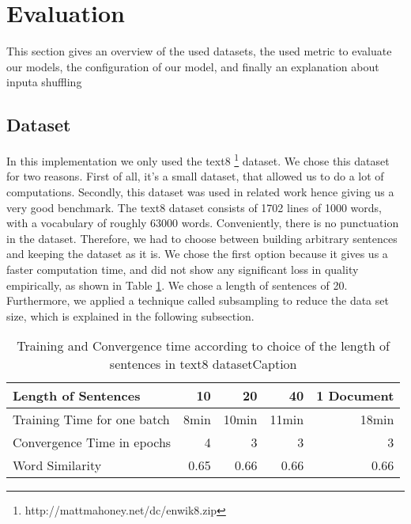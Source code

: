 \section{Evaluation}\label{chap:results}


This section gives an overview of the used datasets, the used metric to evaluate our models, the configuration of our model, and finally an explanation about inputa shuffling

\subsection{Dataset}\label{sec:dataset}
In this implementation we only used the text8 \footnote{http://mattmahoney.net/dc/enwik8.zip} dataset. We chose this dataset for two reasons. First of all, it's a small dataset, that allowed us to do a lot of computations. Secondly, this dataset was used in related work \cite{intel} hence giving us a very good benchmark. The text8 dataset consists of 1702 lines of 1000 words, with a vocabulary of roughly 63000 words. Conveniently, there is no punctuation in the dataset. Therefore, we had to choose between building arbitrary sentences and keeping the dataset as it is. We chose the first option because it gives us a faster computation time, and did not show any significant loss in quality empirically, as shown in Table \ref{table:with_20}. We chose a length of sentences of 20. Furthermore, we applied a technique called subsampling to reduce the data set size, which is explained in the following subsection.

\begin{table}[tb]
    \caption{Training and Convergence time according to choice of the length of sentences in text8 datasetCaption}
    \begin{tabular}{l r r r r}%
        \toprule
          Length of Sentences & 10 & 20 & 40 & 1 Document \\ 

        \midrule%
Training Time for one batch &8min & 10min & 11min & 18min \\ 
Convergence Time in epochs &4  & 3  & 3  & 3  \\ 
Word Similarity& 0.65 & 0.66 & 0.66 & 0.66 \\ \hline
        \midrule%
   \end{tabular}%
   \label{table:with_20}%
\end{table}


